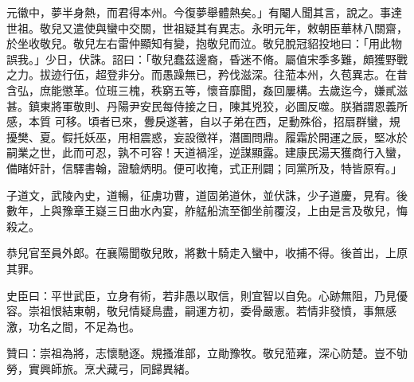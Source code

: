 \begin{pinyinscope}
 元徽中，夢半身熱，而君得本州。今復夢舉體熱矣。」有閹人聞其言，說之。事達世祖。敬兒又遣使與蠻中交關，世祖疑其有異志。永明元年，敕朝臣華林八關齋，於坐收敬兒。敬兒左右雷仲顯知有變，抱敬兒而泣。敬兒脫冠貂投地曰：「用此物誤我。」少日，伏誅。詔曰：「敬兒蠢茲邊裔，昏迷不脩。屬值宋季多難，頗獲野戰之力。拔迹行伍，超登非分。而愚躁無已，矜伐滋深。往蒞本州，久苞異志。在昔含弘，庶能懲革。位班三槐，秩窮五等，懷音靡聞，姦回屢構。去歲迄今，嫌貳滋甚。鎮東將軍敬則、丹陽尹安民每侍接之日，陳其兇狡，必圖反噬。朕猶謂恩義所感，本質
 可移。頃者已來，釁戾遂著，自以子弟在西，足動殊俗，招扇群蠻，規擾樊、夏。假托妖巫，用相震惑，妄設徵祥，潛圖問鼎。履霜於開運之辰，堅冰於嗣業之世，此而可忍，孰不可容！天道禍淫，逆謀顯露。建康民湯天獲商行入蠻，備睹奸計，信驛書翰，證驗炳明。便可收掩，式正刑闢；同黨所及，特皆原宥。」



 子道文，武陵內史，道暢，征虜功曹，道固弟道休，並伏誅，少子道慶，見宥。後數年，上與豫章王嶷三日曲水內宴，舴艋船流至御坐前覆沒，上由是言及敬兒，悔殺之。



 恭兒官至員外郎。在襄陽聞敬兒敗，將數十騎走入蠻中，收捕不得。後首出，上原其罪。



 史臣曰：平世武臣，立身有術，若非愚以取信，則宜智以自免。心跡無阻，乃見優容。崇祖恨結東朝，敬兒情疑鳥盡，嗣運方初，委骨嚴憲。若情非發憤，事無感激，功名之間，不足為也。



 贊曰：崇祖為將，志懷馳逐。規搔淮部，立勛豫牧。敬兒蒞雍，深心防楚。豈不劬勞，實興師旅。烹犬藏弓，同歸異緒。



\end{pinyinscope}